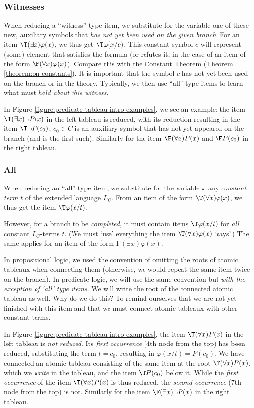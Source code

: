 \subsubsection{Witnesses}
When reducing a ``witness'' type item, we substitute for the variable one of these new, auxiliary symbols that \emph{has not yet been used on the given branch}. For an item $\T(\exists x)\varphi(x)$, we thus get $\T\varphi(x/c)$. This constant symbol $c$ will represent (some) element that satisfies the formula (or refutes it, in the case of an item of the form $\F(\forall x)\varphi(x)$). Compare this with the Constant Theorem (Theorem \ref{theorem:on-constants}). It is important that the symbol $c$ has not yet been used on the branch or in the theory. Typically, we then use ``all'' type items to learn what must \emph{hold about this witness}.

In Figure \ref{figure:predicate-tableau-intro-examples}, we see an example: the item $\T(\exists x)\neg P(x)$ in the left tableau is reduced, with its reduction resulting in the item $\T\neg P(c_0)$; $c_0\in C$ is an auxiliary symbol that has not yet appeared on the branch (and is the first such). Similarly for the item $\F(\forall x)P(x)$ and $\F P(c_0)$ in the right tableau.

\subsubsection{All}
When reducing an ``all'' type item, we substitute for the variable $x$ any \emph{constant term} $t$ of the extended language $L_C$. From an item of the form $\T(\forall x)\varphi(x)$, we thus get the item $\T\varphi(x/t)$.

However, for a branch to be \emph{completed}, it must contain items $\T\varphi(x/t)$ for \emph{all} constant $L_C$-terms $t$. (We must `use' everything the item $\T(\forall x)\varphi(x)$ `says'.) The same applies for an item of the form $\mathrm{F}(\exists x)\varphi(x)$.

In propositional logic, we used the convention of omitting the roots of atomic tableaux when connecting them (otherwise, we would repeat the same item twice on the branch). In predicate logic, we will use the same convention but \emph{with the exception of `all' type items}. We will write the root of the connected atomic tableau as well. Why do we do this? To remind ourselves that we are not yet finished with this item and that we must connect atomic tableaux with other constant terms.

In Figure \ref{figure:predicate-tableau-intro-examples}, the item $\T(\forall x)P(x)$ in the left tableau is \emph{not} \emph{reduced}. Its \emph{first occurrence} (4th node from the top) has been reduced, substituting the term $t=c_0$, resulting in $\varphi(x/t)=P(c_0)$. We have connected an atomic tableau consisting of the same item at the root $\T(\forall x)P(x)$, which we \emph{write} in the tableau, and the item $\T P(c_0)$ below it. While the \emph{first occurrence} of the item $\T(\forall x)P(x)$ is thus reduced, the \emph{second occurrence} (7th node from the top) is not. Similarly for the item $\F(\exists x)\neg P(x)$ in the right tableau.

